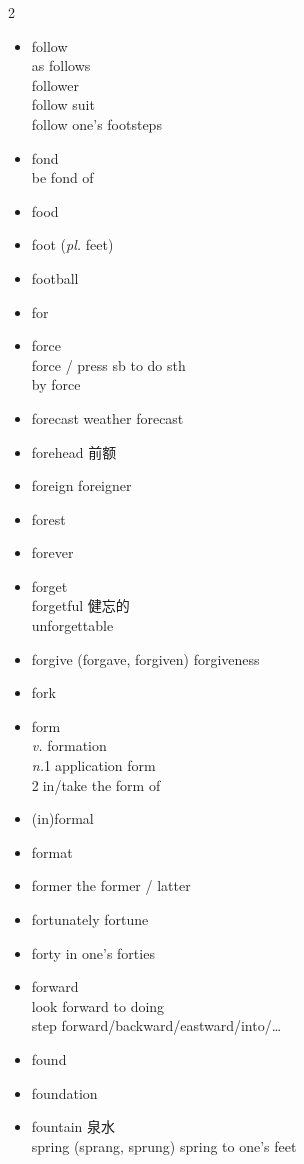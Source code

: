 \documentclass[../../book.tex]{subfiles}
\begin{document}
\begin{multicols}{2}
\begin{itemize}
\item[-] follow
\\as follows
\\follower
\\follow suit
\\follow one\textquoteright s footsteps
\item[-] fond
\\be fond of
\item[-] food
\item[-] foot (\emph{pl.} feet)
\item[-] football
\item[-] for
\item[-] force
\\force / press sb to do sth
\\by force
\item[-] forecast \phantom{a} weather forecast
\item[-] forehead 前额
\item[-] foreign \phantom{a} foreigner
\item[-] forest
\item[-] forever
\item[-] forget
\\forgetful 健忘的
\\unforgettable
\item[-] forgive (forgave, forgiven) forgiveness
\item[-] fork
\item[-] form
\\\emph{v.} \phantom{a} formation
\\\emph{n.}\textcircled{1}application form\\\textcircled{2}in/take the form of
\item[-] (in)formal
\item[-] format
\item[-] former \phantom{a} the former / latter
\item[-] fortunately \phantom{a} fortune
\item[-] forty \phantom{a} in one\textquoteright s forties
\item[-] forward
\\look forward to doing
\\step forward/backward/eastward/into/\ldots
\item[-] found
\item[-] foundation
\item[-] fountain 泉水
\\spring (sprang, sprung) spring to one\textquoteright s feet

\end{itemize}
\end{multicols}
\end{document}
